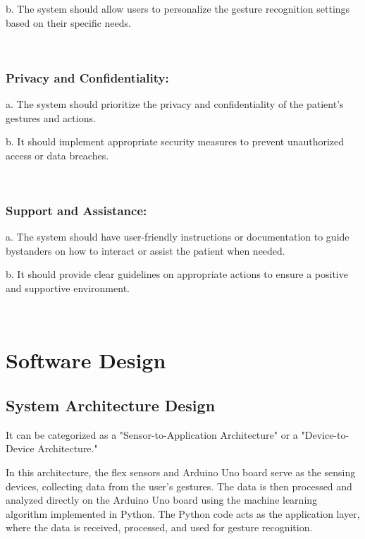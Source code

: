 \documentclass[a4paper,12pt,oneside]{report}
\begin{document}
 \par
b. The system should allow users to personalize the gesture recognition settings based on their specific needs.

\\
\subsection{Privacy and Confidentiality:}
 \par
    
    a. The system should prioritize the privacy and confidentiality of the patient's gestures and actions.
    

 \par
b. It should implement appropriate security measures to prevent unauthorized access or data breaches.

\\
\subsection{Support and Assistance:}
 \par
    
    a. The system should have user-friendly instructions or documentation to guide bystanders on how to interact or assist the patient when needed.
    

 \par
 
    b. It should provide clear guidelines on appropriate actions to ensure a positive and supportive environment.


\\

 

	
 \newpage
 \chapter{Software Design}
 \label{chap:Method}
 \section{System Architecture Design}
 It can be categorized as a "Sensor-to-Application Architecture" or a "Device-to-Device Architecture."

In this architecture, the flex sensors and Arduino Uno board serve as the sensing devices, collecting data from the user's gestures. The data is then processed and analyzed directly on the Arduino Uno board using the machine learning algorithm implemented in Python. The Python code acts as the application layer, where the data is received, processed, and used for gesture recognition.
\end{document}
